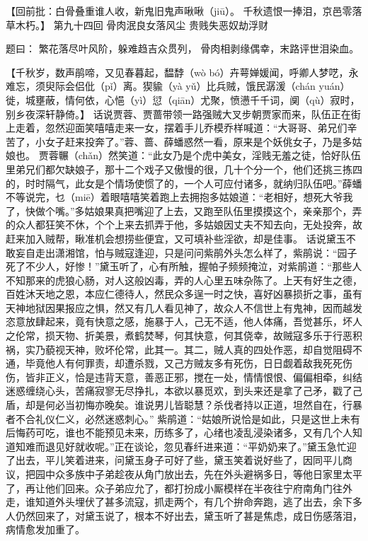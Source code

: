 \documentclass[12pt,oneside]{book}
\begin{document}
【回前批：白骨叠重谁人收，新鬼旧鬼声啾啾（jiū）。
千秋遗恨一捧泪，京邑零落草木朽。】
第九十四回 骨肉泯良女落风尘 贵贱失恶奴劫浮财

题曰：
繁花落尽叶风阶，躲难趋吉众贯列，
骨肉相剥缘偶幸，末路评世泪染血。

【千秋岁，数声鹃啼，又见春暮起，馧馞（wò bó）卉萼婵媛闻，呼卿人梦呓，永难忘，须臾际会侣仳（pǐ）离。猰貐（yà yǔ）比兵贼，饿民潺湲（chán yuán）徙，城壅蔽，情何依，心悒（yì）愆（qiān）尤聚，愤懑千千词，阒（qù）寂时，别乡夜深轩静倚。】
话说贾蓉、贾蔷带领一路强贼大叉步朝贾家而来，队伍正在街上走着，忽然迎面笑嘻嘻走来一女，摆着手儿乔模乔样喊道：“大哥哥、弟兄们辛苦了，小女子赶来投奔了。”蓉、蔷、薛蟠惑然一看，原来是个妖佻女子，乃是多姑娘也。
贾蓉冁（chǎn）然笑道：“此女乃是个虎中美女，淫贱无羞之徒，恰好队伍里弟兄们都欠缺娘子，那十二个戏子又傲慢的很，几十个分一个，他们还挑三拣四的，时时隔气，此女是个情场使惯了的，一个人可应付诸多，就纳归队伍吧。”薛蟠不等说完，乜（miē）着眼嘻嘻笑着跑上去拥抱多姑娘道：“老相好，想死大爷我了，快做个嘴。”多姑娘果真把嘴迎了上去，又跑至队伍里摸摸这个，亲亲那个，弄的众人都狂笑不休，个个上来去抓弄于他，多姑娘因丈夫不知去向，无处投奔，故赶来加入贼帮，瞅准机会想捞些便宜，又可填补些淫欲，却是佳事。
话说黛玉不敢妄自走出潇湘馆，怕与贼寇逢迎，只是问问紫鹃外头怎么样了，紫鹃说：“园子死了不少人，好惨！”黛玉听了，心有所触，握帕子频频掩泣，对紫鹃道：“那些人不知那来的虎狼心肠，对人这般凶毒，弄的人心里五味杂陈了。上天有好生之德，百姓沐天地之恩，本应仁德待人，然民众多逞一时之快，喜好凶暴损折之事，虽有天神地狱因果报应之惧，然又有几人看见神了，故众人不信世上有鬼神，因而越发恣意放肆起来，竟有快意之感，施暴于人，己无不适，他人体痛，吾觉甚乐，坏人之伦常，损天物、折美景，煮鹤焚琴，何其快意，何其侥幸，故贼寇多乐于行恶积祸，实乃藐视天神，败坏伦常，此其一。其二，贼人真的四处作恶，却自觉阻碍不通，毕竟他人有何罪责，却遭杀戮，又己方贼友多有死伤，日日觑着敌我死死伤伤，皆非正义，恰是违背天意，善恶正邪，搅在一处，情情恨恨、偏偏相牵，纠结迷惑缠绕心头，苦痛寂寥无尽挣扎，本欲以暴觅欢，到头来还是拿了己矛，戳了己盾，却是何必当初悔亦晚矣。谁说男儿皆聪慧？杀伐者持以正道，坦然自在，行暴者不合礼仪仁义，必然迷惑刺心。”
紫鹃道：“姑娘所说恰是如此，只是这世上未有后悔药可吃，谁也不能预见未来，历练多了，心绪也凌乱浸染诸多，又有几个人知道知难而退见好就收呢。”正在谈论，忽见春纤进来道：“平奶奶来了。”黛玉急忙迎了出去，平儿笑着进来，问黛玉身子可好了些，黛玉笑着说好些了，因同平儿商议，把园中众多族中子弟趁夜从角门放出去，先在外头避祸多日，等他日家里太平了，再让他们回来。众子弟应允了，都打扮成小厮模样在半夜往宁府南角门往外走，谁知道外头埋伏了甚多流寇，抓走两个，有几个拚命奔跑，逃了出去，余下多人仍然回来了，对黛玉说了，根本不好出去，黛玉听了甚是焦虑，成日伤感落泪，病情愈发加重了。
\end{document}

